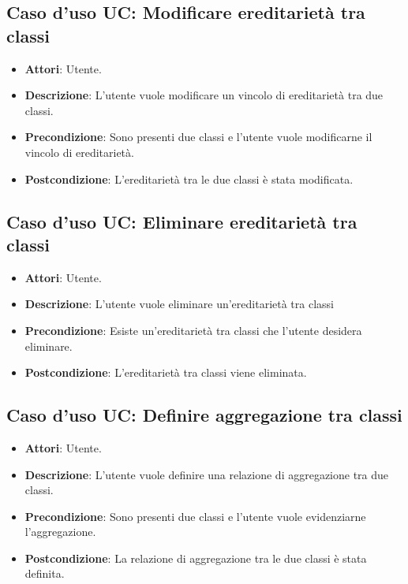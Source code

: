\documentclass[../AnalisiDeiRequisiti.tex]{subfiles}
\begin{document}
		\subsection{Caso d'uso UC: Modificare ereditarietà tra classi}
		\begin{itemize}
			\item\textbf{Attori}: Utente.
			\item\textbf{Descrizione}: L'utente vuole modificare un vincolo di ereditarietà tra due classi.
			\item\textbf{Precondizione}: Sono presenti due classi e l'utente vuole modificarne il vincolo di ereditarietà.
			\item\textbf{Postcondizione}: L'ereditarietà tra le due classi è stata modificata.
		\end{itemize}
		
		\subsection{Caso d'uso UC: Eliminare ereditarietà tra classi}
		\begin{itemize}
			\item\textbf{Attori}: Utente.
			\item\textbf{Descrizione}: L'utente vuole eliminare un'ereditarietà tra classi
			\item\textbf{Precondizione}: Esiste un'ereditarietà tra classi che l'utente desidera eliminare.
			\item\textbf{Postcondizione}: L'ereditarietà tra classi viene eliminata.
		\end{itemize}
		
		\subsection{Caso d'uso UC: Definire aggregazione tra classi}
		\begin{itemize}
			\item\textbf{Attori}: Utente.
			\item\textbf{Descrizione}: L'utente vuole definire una relazione di aggregazione tra due classi.
			\item\textbf{Precondizione}: Sono presenti due classi e l'utente vuole evidenziarne l'aggregazione.
			\item\textbf{Postcondizione}: La relazione di aggregazione tra le due classi è stata definita.
		\end{itemize}
		
\end{document}
